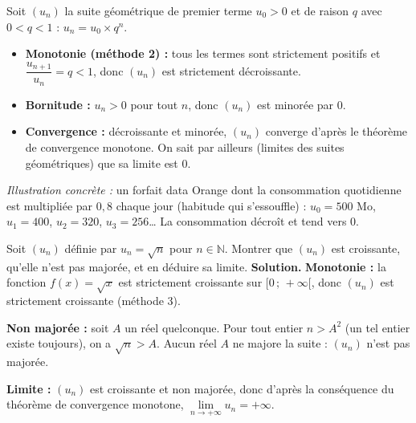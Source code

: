 \documentclass[11pt]{article}
\begin{document}
\begin{exemplebox}
Soit $(u_n)$ la suite géométrique de premier terme $u_0 > 0$ et de raison $q$ avec $0 < q < 1$ : $u_n = u_0 \times q^n$.
\begin{itemize}
\item \textbf{Monotonie (méthode 2) :} tous les termes sont strictement positifs et $\dfrac{u_{n+1}}{u_n} = q < 1$, donc $(u_n)$ est strictement décroissante.
\item \textbf{Bornitude :} $u_n > 0$ pour tout $n$, donc $(u_n)$ est minorée par $0$.
\item \textbf{Convergence :} décroissante et minorée, $(u_n)$ converge d'après le théorème de convergence monotone. On sait par ailleurs (limites des suites géométriques) que sa limite est $0$.
\end{itemize}
\emph{Illustration concrète :} un forfait data Orange dont la consommation quotidienne est multipliée par $0{,}8$ chaque jour (habitude qui s'essouffle) : $u_0 = 500$ Mo, $u_1 = 400$, $u_2 = 320$, $u_3 = 256$\ldots{} La consommation décroît et tend vers $0$.
\end{exemplebox}

\begin{exoresolu}
Soit $(u_n)$ définie par $u_n = \sqrt{n}$ pour $n \in \mathbb{N}$. Montrer que $(u_n)$ est croissante, qu'elle n'est pas majorée, et en déduire sa limite.
\tcblower
\textbf{Solution.} \textbf{Monotonie :} la fonction $f(x) = \sqrt{x}$ est strictement croissante sur $[0\,;\,+\infty[$, donc $(u_n)$ est strictement croissante (méthode 3).

\textbf{Non majorée :} soit $A$ un réel quelconque. Pour tout entier $n > A^2$ (un tel entier existe toujours), on a $\sqrt{n} > A$. Aucun réel $A$ ne majore la suite : $(u_n)$ n'est pas majorée.

\textbf{Limite :} $(u_n)$ est croissante et non majorée, donc d'après la conséquence du théorème de convergence monotone, $\lim\limits_{n \to +\infty} u_n = +\infty$.
\end{exoresolu}
\end{document}
